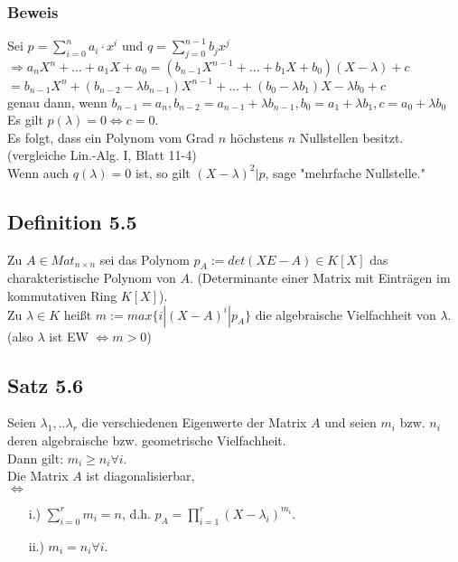 \documentclass[a4paper, 12pt]{extarticle}
\begin{document}
\subsubsection*{Beweis}
Sei $p = \sum_{i=0}^{n} a_i \cdot x^i$ und $q = \sum_{j=0}^{n-1}b_j x^j$\\
$\Rightarrow a_nX^n + ... + a_1X + a_0 =(b_{n-1}X^{n-1} + ... + b_1X + b_0)(X-\lambda) + c$\\
$= b_{n-1}X^{n} + (b_{n-2} - \lambda b_{n-1})X^{n-1} + ... + (b_0 - \lambda b_1)X-\lambda b_0 + c$\\
genau dann, wenn $b_{n-1} = a_n, b_{n-2} = a_{n-1} + \lambda b_{n-1}, b_0 = a_1 + \lambda b_1, c = a_0 + \lambda b_0$\\
Es gilt $p(\lambda) = 0 \Leftrightarrow c = 0$. \\
Es folgt, dass ein Polynom vom Grad $n$ höchstens $n$ Nullstellen besitzt. \\
(vergleiche Lin.-Alg. I, Blatt 11-4)\\
Wenn auch $q(\lambda) = 0$ ist, so gilt $(X - \lambda)^2 |p$, sage "mehrfache Nullstelle."\\

\subsection*{Definition 5.5}
Zu $A \in Mat_{n\times n}$ sei das Polynom $p_A := det(XE - A) \in K[X]$ das charakteristische Polynom von $A$. (Determinante einer Matrix mit Einträgen im kommutativen Ring $K[X]$). \\
Zu $\lambda \in K$ heißt $m:= max\{i|(X-A)^i|p_A\}$ die algebraische Vielfachheit von $\lambda$. (also $\lambda$ ist EW $\Leftrightarrow m > 0$)

\subsection*{Satz 5.6}
Seien $\lambda_1, .. \lambda_r$ die verschiedenen Eigenwerte der Matrix $A$ und seien $m_i$ bzw. $n_i$ deren algebraische bzw. geometrische Vielfachheit. \\
Dann gilt: $m_i \geq n_i \forall i$. \\
Die Matrix $A$ ist diagonalisierbar,\\
$\Leftrightarrow$
\begin{itemize}
	\item [i.)] $\sum_{i=0}^{r} m_i = n$, d.h. $p_A = \prod_{i=1}^{r} (X- \lambda_i)^{m_i}$. 
	\item [ii.)] $m_i = n_i \forall i$.
\end{itemize}
\end{document}

